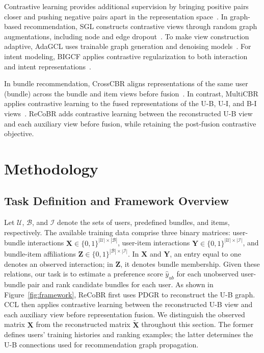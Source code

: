 \documentclass[letterpaper]{article}
\begin{document}
Contrastive learning provides additional supervision by bringing positive pairs closer and pushing negative pairs apart in the representation space~\cite{chen2020simclr}. In graph-based recommendation, SGL constructs contrastive views through random graph augmentations, including node and edge dropout~\cite{wu2021sgl}. To make view construction adaptive, AdaGCL uses trainable graph generation and denoising models~\cite{jiang2023adagcl}. For intent modeling, BIGCF applies contrastive regularization to both interaction and intent representations~\cite{zhang2024bigcf}.

In bundle recommendation, CrossCBR aligns representations of the same user (bundle) across the bundle and item views before fusion~\cite{ma2022crosscbr}. In contrast, MultiCBR applies contrastive learning to the fused representations of the U-B, U-I, and B-I views~\cite{ma2024multicbr}. ReCoBR adds contrastive learning between the reconstructed U-B view and each auxiliary view before fusion, while retaining the post-fusion contrastive objective.






\section{Methodology}\label{sec:methodology}

\subsection{Task Definition and Framework Overview}

Let $\mathcal U$, $\mathcal B$, and $\mathcal I$ denote the sets of users, predefined bundles, and items, respectively. The available training data comprise three binary matrices: user-bundle interactions $\mathbf X\in\{0,1\}^{|\mathcal U|\times|\mathcal B|}$, user-item interactions $\mathbf Y\in\{0,1\}^{|\mathcal U|\times|\mathcal I|}$, and bundle-item affiliations $\mathbf Z\in\{0,1\}^{|\mathcal B|\times|\mathcal I|}$. In $\mathbf X$ and $\mathbf Y$, an entry equal to one denotes an observed interaction; in $\mathbf Z$, it denotes bundle membership. Given these relations, our task is to estimate a preference score $\hat y_{ub}$ for each unobserved user-bundle pair and rank candidate bundles for each user. As shown in Figure~\ref{fig:framework}, ReCoBR first uses PDGR to reconstruct the U-B graph. CCL then applies contrastive learning between the reconstructed U-B view and each auxiliary view before representation fusion. We distinguish the observed matrix $\mathbf X$ from the reconstructed matrix $\widetilde{\mathbf X}$ throughout this section. The former defines users' training histories and ranking examples; the latter determines the U-B connections used for recommendation graph propagation.
\end{document}
